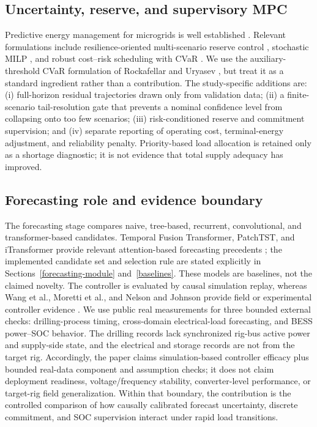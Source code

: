 \subsection{Uncertainty, reserve, and supervisory MPC}

Predictive energy management for microgrids is well established
\citep{hu2021mpcoverview,abbasi2023emsreview}. Relevant formulations include
resilience-oriented multi-scenario reserve control
\citep{tobajas2022resilience}, stochastic MILP
\citep{franke2020stochasticmilp}, and robust cost--risk scheduling with CVaR
\citep{ji2018robustcvar}. We use the auxiliary-threshold CVaR formulation of
Rockafellar and Uryasev \citep{rockafellar2000cvar}, but treat it as a standard
ingredient rather than a contribution. The study-specific additions are:
(i) full-horizon residual trajectories drawn only from validation data;
(ii) a finite-scenario tail-resolution gate that prevents a nominal confidence
level from collapsing onto too few scenarios; (iii) risk-conditioned reserve
and commitment supervision; and (iv) separate reporting of operating cost,
terminal-energy adjustment, and reliability penalty. Priority-based load
allocation is retained only as a shortage diagnostic; it is not evidence that
total supply adequacy has improved.

\subsection{Forecasting role and evidence boundary}

The forecasting stage compares naive, tree-based, recurrent, convolutional,
and transformer-based candidates. Temporal Fusion Transformer, PatchTST, and
iTransformer provide relevant attention-based forecasting precedents
\citep{lim2021tft,nie2023patchtst,liu2024itransformer}; the implemented candidate
set and selection rule are stated explicitly in
Sections~\ref{forecasting-module} and~\ref{baselines}.
These models are baselines, not the claimed novelty. The controller is evaluated
by causal simulation replay, whereas Wang et al., Moretti et al., and Nelson
and Johnson provide field or experimental controller evidence
\citep{wang2025dualpower,moretti2019twolayer,nelson2020realtime}. We use public
real measurements for three bounded external checks: drilling-process timing,
cross-domain electrical-load forecasting, and BESS power--SOC behavior. The
drilling records lack synchronized rig-bus active power and supply-side state,
and the electrical and storage records are not from the target rig. Accordingly,
the paper claims simulation-based controller efficacy plus bounded real-data
component and assumption checks; it does not claim deployment readiness,
voltage/frequency stability, converter-level performance, or target-rig field
generalization. Within that boundary, the contribution is the controlled
comparison of how causally calibrated forecast uncertainty, discrete
commitment, and SOC supervision interact under rapid load transitions.

